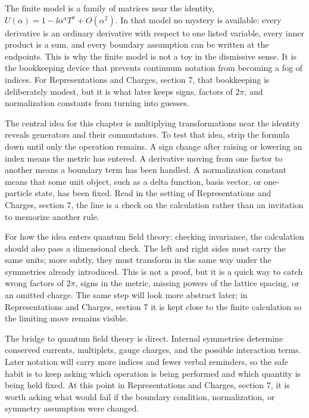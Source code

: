 The finite model is a family of matrices near the identity, \(U(\alpha)=1-\ii\alpha^aT^a+O(\alpha^2)\).  In that model no mystery is available: every derivative is an ordinary derivative with respect to one listed variable, every inner product is a sum, and every boundary assumption can be written at the endpoints.  This is why the finite model is not a toy in the dismissive sense.  It is the bookkeeping device that prevents continuum notation from becoming a fog of indices.  For Representations and Charges, section 7, that bookkeeping is deliberately modest, but it is what later keeps signs, factors of \(2\pi\), and normalization constants from turning into guesses.

The central idea for this chapter is multiplying transformations near the identity reveals generators and their commutators.  To test that idea, strip the formula down until only the operation remains.  A sign change after raising or lowering an index means the metric has entered.  A derivative moving from one factor to another means a boundary term has been handled.  A normalization constant means that some unit object, such as a delta function, basis vector, or one-particle state, has been fixed.  Read in the setting of Representations and Charges, section 7, the line is a check on the calculation rather than an invitation to memorize another rule.

For how the idea enters quantum field theory: checking invariance, the calculation should also pass a dimensional check.  The left and right sides must carry the same units; more subtly, they must transform in the same way under the symmetries already introduced.  This is not a proof, but it is a quick way to catch wrong factors of \(2\pi\), signs in the metric, missing powers of the lattice spacing, or an omitted charge.  The same step will look more abstract later; in Representations and Charges, section 7 it is kept close to the finite calculation so the limiting move remains visible.

The bridge to quantum field theory is direct.  Internal symmetries determine conserved currents, multiplets, gauge charges, and the possible interaction terms.  Later notation will carry more indices and fewer verbal reminders, so the safe habit is to keep asking which operation is being performed and which quantity is being held fixed.  At this point in Representations and Charges, section 7, it is worth asking what would fail if the boundary condition, normalization, or symmetry assumption were changed.

